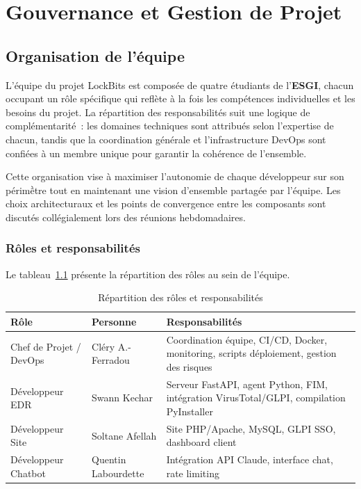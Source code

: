 
\chapter{Gouvernance et Gestion de Projet}

\section{Organisation de l'\'equipe}

L'\'equipe du projet LockBits est compos\'ee de quatre \'etudiants de
l'\textbf{ESGI}, chacun occupant un r\^ole sp\'ecifique qui refl\`ete \`a
la fois les comp\'etences individuelles et les besoins du projet. La
r\'epartition des responsabilit\'es suit une logique de compl\'ementarit\'e~:
les domaines techniques sont attribu\'es selon l'expertise de chacun,
tandis que la coordination g\'en\'erale et l'infrastructure DevOps sont
confi\'ees \`a un membre unique pour garantir la coh\'erence de
l'ensemble.

Cette organisation vise \`a maximiser l'autonomie de chaque d\'eveloppeur
sur son p\'erim\`être tout en maintenant une vision d'ensemble partag\'ee
par l'\'equipe. Les choix architecturaux et les points de convergence
entre les composants sont discut\'es coll\'egialement lors des r\'eunions
hebdomadaires.

\subsection{R\^oles et responsabilit\'es}

Le tableau~\ref{tab:rôles} pr\'esente la r\'epartition des r\^oles au
sein de l'\'equipe.

\begin{table}[h]
  \centering
  \caption{R\'epartition des r\^oles et responsabilit\'es}
  \label{tab:rôles}
  \begin{tabular}{@{}llp{7cm}@{}}
    \toprule
    \textbf{R\^ole} & \textbf{Personne} & \textbf{Responsabilit\'es} \\
    \midrule
    Chef de Projet / DevOps
      & Cl\'ery A.-Ferradou
      & Coordination \'equipe, CI/CD, Docker, monitoring,
        scripts d\'eploiement, gestion des risques \\
    D\'eveloppeur EDR
      & Swann Kechar
      & Serveur FastAPI, agent Python, FIM, int\'egration
        VirusTotal/GLPI, compilation PyInstaller \\
    D\'eveloppeur Site
      & Soltane Afellah
      & Site PHP/Apache, MySQL, GLPI SSO, dashboard client \\
    D\'eveloppeur Chatbot
      & Quentin Labourdette
      & Int\'egration API Claude, interface chat,
        rate limiting \\
    \bottomrule
  \end{tabular}
\end{table}


